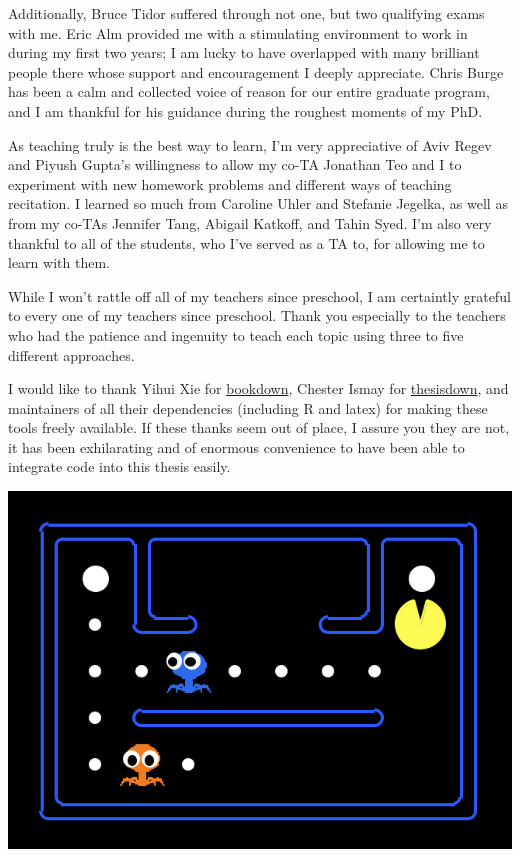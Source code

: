 \documentclass[12pt,twoside]{mitthesis-manusdown}
\begin{document}
Additionally, Bruce Tidor suffered through not one, but two qualifying
exams with me. Eric Alm provided me with a stimulating environment to
work in during my first two years; I am lucky to have overlapped with
many brilliant people there whose support and encouragement I deeply
appreciate. Chris Burge has been a calm and collected voice of reason
for our entire graduate program, and I am thankful for his guidance
during the roughest moments of my PhD.

As teaching truly is the best way to learn, I'm very appreciative of
Aviv Regev and Piyush Gupta's willingness to allow my co-TA Jonathan Teo
and I to experiment with new homework problems and different ways of
teaching recitation. I learned so much from Caroline Uhler and Stefanie
Jegelka, as well as from my co-TAs Jennifer Tang, Abigail Katkoff, and
Tahin Syed. I'm also very thankful to all of the students, who I've
served as a TA to, for allowing me to learn with them.

While I won't rattle off all of my teachers since preschool, I am
certaintly grateful to every one of my teachers since preschool. Thank
you especially to the teachers who had the patience and ingenuity to
teach each topic using three to five different approaches.

I would like to thank Yihui Xie for
\href{https://github.com/rstudio/bookdown}{bookdown}, Chester Ismay for
\href{https://github.com/ismayc/thesisdown}{thesisdown}, and maintainers
of all their dependencies (including R and latex) for making these tools
freely available. If these thanks seem out of place, I assure you they
are not, it has been exhilarating and of enormous convenience to have
been able to integrate code into this thesis easily.
\begin{center}\includegraphics[width=0.7\linewidth]{figuresintro/bacmanSmall} \end{center}
\end{document}
